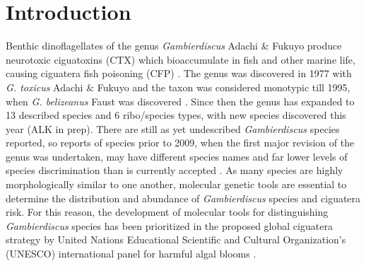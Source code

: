 \documentclass[12pt]{article}
\begin{document}
\section{Introduction}
Benthic dinoflagellates of the genus \emph{Gambierdiscus} Adachi \& Fukuyo produce neurotoxic ciguatoxins (CTX) which bioaccumulate in fish and other marine life, causing ciguatera fish poisoning (CFP) \citep{chinain1997intraspecific,holmes1998gambierdiscus}. The genus was discovered in 1977 with \emph{G. toxicus} Adachi \& Fukuyo \citep{adachi1979thecal} and the taxon was considered monotypic till 1995, when \emph{G. belizeanus} Faust was discovered \citep{faust1995observation}. Since then the genus has expanded to 13 described species and 6 ribo/species types, with new species discovered this year \citep{fraga2016gambierdiscus,litaker2010global,adachi1979thecal,faust1995observation,chinain1999morphology,litaker2009taxonomy,nishimura2014morphology,fraga2011gambierdiscus,xu2014distribution,fraga2014genus} (ALK in prep).
There are still as yet undescribed \textit{Gambierdiscus }species reported,  so reports of species prior to 2009, when the first major revision of the genus was undertaken, may have different species names and far lower levels of species discrimination than is currently accepted \citep{berdalet2012global,nishimura2014morphology}. As many species are highly morphologically similar to one another, molecular genetic tools are essential to determine the distribution and abundance of  \textit{Gambierdiscus} species  and ciguatera risk. For this reason, the development of molecular tools for distinguishing \textit{Gambierdiscus} species has been prioritized in the proposed global ciguatera strategy by United Nations Educational Scientific and Cultural Organization's (UNESCO) international panel for harmful algal blooms \citep{litaker2010global,globalcig}. \\

\end{document}
